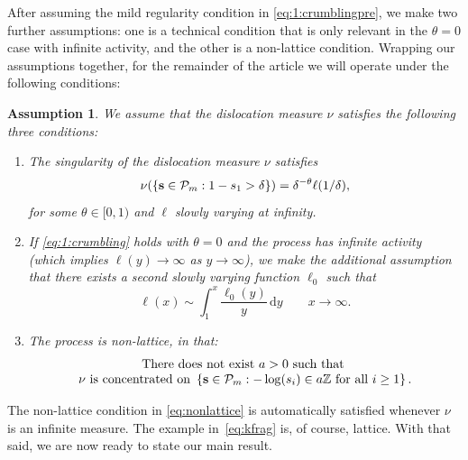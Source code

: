 \documentclass[a4,12pt]{amsart}
\numberwithin{equation}{section}
\newtheorem{assu}{Assumption}
\newcommand{\MassP}{\mathcal{P}_{\rm m}}
\begin{document}
    After assuming the mild regularity condition in \eqref{eq:1:crumblingpre}, we make two further assumptions: one is a technical condition that is only relevant in the $\theta = 0$ case with infinite activity, and the other is a non-lattice condition.
    Wrapping our assumptions together, for the remainder of the article we will operate under the following conditions:
    
   \begin{assu} \label{assu:1}
    We assume that the dislocation measure $\nu$ satisfies the following three conditions:
    \begin{enumerate}
        \item The singularity of the dislocation measure $\nu$ satisfies
            \begin{equation}\label{eq:1:crumbling}
        		\nu( \{\mathbf{s}\in \MassP: 1- s_1 > \delta \} ) = \delta^{ - \theta} \ell(1/\delta),
        	\end{equation}
            for some $\theta \in [0,1)$ and $\ell$ slowly varying at infinity. 
        \item If \eqref{eq:1:crumbling} holds with $\theta = 0$ and the process has infinite activity 
            (which implies $\ell(y) \to \infty$ as $y \to \infty$), we make the additional assumption 
            that there exists a second slowly varying function $\ell_0$ such that 
            \begin{equation}\label{eq:1:fortheta0}
              \ell(x) \sim \int_1^x \frac{\ell_0(y)}{y} \, \mathrm{d}y \qquad x \to \infty.
        	\end{equation}
        \item The process is non-lattice, in that:
        	\begin{equation} \label{eq:nonlattice}
            		\begin{array}{c}\text{There does not exist } a > 0 \text{ such that } \\ \nu \text{ is concentrated on } 
        		\left\{ \mathbf{s} \in \MassP : -\log(s_i) \in a\mathbb{Z} \text{ for all } i \geq 1 \right\}.\end{array}
        	\end{equation}
    \end{enumerate}
    \end{assu}


    The non-lattice condition in \eqref{eq:nonlattice} is automatically satisfied whenever $\nu$ is an infinite measure. 
    The example in~\eqref{eq:kfrag} is, of course, lattice. With that said, we are now ready to state our main result.
\end{document}
